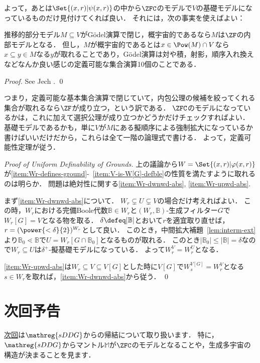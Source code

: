 \documentclass[a4j,leqno]{ltjsarticle}
\newcommand{\sDDG}{\mathreg{sDDG}}
\theoremstyle{nonumberplain}
\begin{document}
よって，あとは$\Set{(x, r) | \psi(x, r)}$の中から$\ZFC$のモデルで$V$の基礎モデルになっているものだけ見付けてくれば良い．
それには，次の事実を使えばよい：
\begin{fact}
 推移的部分モデル$M \subseteq V$がG\"{o}del演算で閉じ，概宇宙的であるなら$M$は$\ZF$の内部モデルとなる．
 但し，$M$が概宇宙的であるとは$x \in \Pow(M) \cap V$なら$x \subseteq y \in M$なる$y$が取れることであり，G\"{o}del演算は対や積，射影，順序入れ換えなどなんか良い感じの定義可能な集合演算10個のことである．
\end{fact}
\begin{proof}
 See Jech \cite[Theorem 13.9]{Jech:2002}. \qed
\end{proof}
つまり，定義可能な基本集合演算で閉じていて，内包公理の候補を絞ってくれる集合が取れるなら$\ZF$が成り立つ，という訳である．
$\ZFC$のモデルになっているかは，これに加えて選択公理が成り立つかどうかだけチェックすればよい．
基礎モデルであるかも，単に$V$が$M$にある擬順序による強制拡大になっているか書けばいいだけだから，これらは全て一階の論理式で書ける．
よって，定義可能性定理が従う．
\begin{proof}[Proof of Uniform Definability of Grounds]
 上の議論から$W = \Set{ (x, r) | \varphi(x, r)}$が\ref{item:Wr-defines-ground}-~\ref{item:V-is-W[G]-defble}の性質を満たすように取れるのは明らか．
 問題は絶対性に関する\ref{item:Wr-dwnwd-abs}, \ref{item:Wr-upwd-abs}.

 まず\ref{item:Wr-dwnwd-abs}について．
 $W_r \subsetneq U \subsetneq V$の場合だけ考えればよい．
 この時，$W_r$における完備Boole代数$\mathbb{B} \in W_r$と$(W_r, \mathbb{B})$-生成フィルター$G$で$W_r[G] = V$となる物を取る．
 $\delta \defeq |\mathbb{B}|$とおいて$r$を適宜取り直せば，$r = (\power{<\delta}{2})^{W_r}$として良い．
 このとき，中間拡大補題~\ref{lem:interm-ext}より$\mathbb{B}_0 \lessdot \mathbb{B}$で$U = W_r[G \cap \mathbb{B}_0]$となるものが取れる．
 このとき$|\mathbb{B}_0| \leq |\mathbb{B}| = \delta$なので$W_r \subseteq U$は$\delta^+$-擬基礎モデルになっている．
 よって$W_r^V = W_r^U$となる．

 \ref{item:Wr-upwd-abs}は$W_r \subseteq V \subseteq V[G]$とした時に$V[G]$で$W_s^{V[G]} = W_r^V$となる$s \in W_r$を取れば，\ref{item:Wr-dwnwd-abs}から従う． \qed
\end{proof}

\section*{次回予告}
\href{http://konn-san.com/math/geology-mantle-and-ddg.html}{次回}は$\sDDG$からの帰結について取り扱います．
特に，$\sDDG$からマントル$\mathbb{M}$が$\ZFC$のモデルとなることや，生成多宇宙の構造が決まることを見ます．

\nocite{Fuchs:2014fj,Usuba:2017fp,Reitz:2007af}
\printbibliography[title=参考文献]
\end{document}
